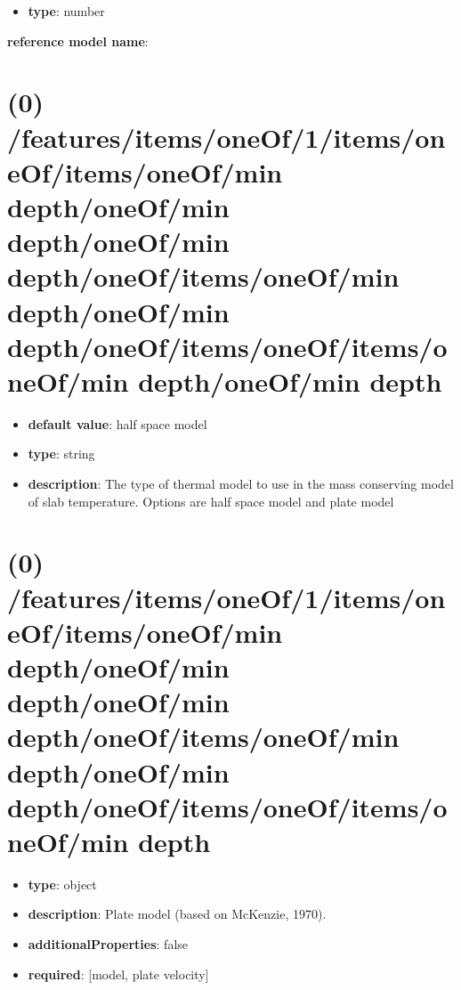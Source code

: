 \begin{itemize}[leftmargin=3em]\item {\bf type}: number
\end{itemize}\item {\bf reference model name}: \section{(0) /features/items/oneOf/1/items/oneOf/items/oneOf/min depth/oneOf/min depth/oneOf/min depth/oneOf/items/oneOf/min depth/oneOf/min depth/oneOf/items/oneOf/items/oneOf/min depth/oneOf/min depth}
\begin{itemize}[leftmargin=0em]\item {\bf default value}: half space model
\item {\bf type}: string
\item {\bf description}: The type of thermal model to use in the mass conserving model of slab temperature. Options are half space model and plate model
\end{itemize}\section{(0) /features/items/oneOf/1/items/oneOf/items/oneOf/min depth/oneOf/min depth/oneOf/min depth/oneOf/items/oneOf/min depth/oneOf/min depth/oneOf/items/oneOf/items/oneOf/min depth}
\begin{itemize}[leftmargin=0em]\item {\bf type}: object
\item {\bf description}: Plate model (based on McKenzie, 1970).
\item {\bf additionalProperties}: false
\item {\bf required}: [model, plate velocity]\end{itemize}
